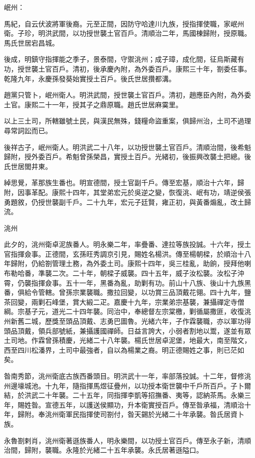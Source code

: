 \begin{pinyinscope}
岷州：

馬紀，自云伏波將軍後裔。元至正間，因防守哈達川九族，授指揮使職，家岷州衛。子珍，明洪武間，以功授世襲土官百戶。清順治二年，馬國棟歸附，授原職。馬氏世居宕昌城。

後成，明鎮守指揮能之季子，景泰間，守禦洮州；成子璋，成化間，征烏斯藏有功，授世襲土官百戶。清初，後承慶內附，為外委百戶。康熙三十年，劄委任事。乾隆九年，永慶孫發葵始實授土百戶。後氏世居攢都溝。

趙黨只管卜，岷州衛人。明洪武間，授世襲土官百戶。清初，趙應臣內附，為外委土官。康熙二十一年，授其子之鼎原職。趙氏世居麻霙里。

以上三土司，所轄雖號土民，與漢民無殊，錢糧命盜重案，俱歸州治，土司不過理尋常詞訟而已。

後祥古子，岷州衛人。明洪武二十八年，以功授世襲土官百戶。清順治間，後希魁歸附，授外委百戶。希魁曾孫榮昌，實授土百戶。光緒初，後振興改襲土把總。後氏世居閭井東。

綽思覺，革那族生番也。明宣德間，授土官副千戶。傳至宏基，順治十六年，歸附，因事革配。康熙十四年，其堂弟宏元於吳逆之變，恢復洮、岷有功，靖逆侯張勇題敘，仍授世襲副千戶。二十九年，宏元子廷賢，雍正初，與黃番煽亂，改土歸流。

洮州：

此夕的，洮州衛卓泥族番人。明永樂二年，率疊番、達拉等族投誠。十六年，授土官指揮僉事。正德間，玄孫旺秀調京引見，賜姓名楊洪。傳至楊朝樑，於順治十八年歸附，仍給劄管理土務，為外委土司。康熙十四年，吳三桂亂，助餉，授拜他喇布勒哈番，準襲二次。二十年，朝樑子威襲。四十五年，威子汝松襲。汝松子沖霄，仍襲指揮僉事。五十一年，黑番為亂，助剿有功。前山十八族、後山十九族黑番，俱給令管轄。曾孫宗業襲職。撒拉回變，以功賞三品頂戴花翎。四十九年，鹽茶回變，兩剿石峰堡，賞大緞二疋。嘉慶十九年，宗業弟宗基襲，兼攝禪定寺僧綱。宗基子元，道光二十四年襲。同治中，奉總督左宗棠檄，剿循屬撒匪，收復洮州新舊二城，歷獎至頭品頂戴、志勇巴圖魯。光緒六年，子作霖襲職，亦以軍功得頭品頂戴，領兵部號紙，兼攝護國禪師。日益言誇大，小弱者割地以鬻，遂並有眾土司地。作霖曾孫積慶，光緒二十八年襲。楊氏世居卓泥堡，地最大，南至階文，西至四川松潘界，土司中最強者，自以為楊業之裔。明正德賜姓之事，則已茫如矣。

昝南秀節，洮州衛底古族西番頭目。明洪武十一年，率部落投誠。十二年，督修洮州邊壕城池。十九年，隨指揮馬煜征疊州，以功授本衛世襲中千戶所百戶。子卜爾結，於洪武二十年襲。二十五年，同指揮李凱等招撫番、夷等，認納茶馬。永樂三年，賜姓昝。宣德五年，以護送侯顯功，升本衛實授百戶。傳至昝承福，清順治十年，歸附。奉洮州衛軍民指揮使司劄付，昝天錫於光緒二十年承襲。昝氏居資卜族。

永魯劄剌肖，洮州衛著遜族番人，明永樂間，以功授土官百戶。傳至永子新，清順治間，歸附，襲職。永隆於光緒二十五年承襲。永氏居著遜隘口。


\end{pinyinscope}
